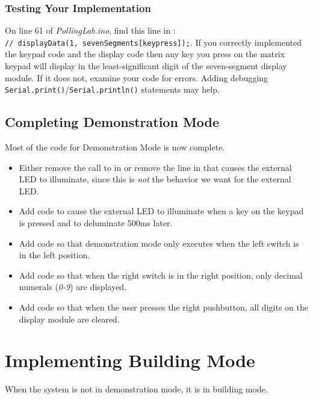 \subsubsection{Testing Your Implementation}

On line 61 of \textit{PollingLab.ino}, find this line in : \\
\lstinline{// displayData(1, sevenSegments[keypress]);}. If you correctly
implemented the keypad code and the display code then any key you press on the
matrix keypad will display in the least-significant digit of the seven-segment
display module. If it does not, examine your code for errors. Adding debugging
\lstinline{Serial.print()}/\lstinline{Serial.println()} statements may help.

\subsection{Completing Demonstration Mode}

Most of the code for Demonstration Mode is now complete.

    \begin{itemize}
    \item Either remove the call to  in
         or remove the line in  that
        causes the external LED to illuminate, since this is \textit{not} the
        behavior we want for the external LED.
    \item Add code to cause the external LED to illuminate when a key on the
        keypad is pressed and to deluminate 500ms later.
    \item Add code so that demonstration mode only executes when the left
        switch is in the left position.
    \item Add code so that when the right switch is in the right position, only
        decimal numerals (\textit{0-9}) are displayed.
    \item Add code so that when the user presses the right pushbutton, all
        digits on the display module are cleared.
    \end{itemize}

\section{Implementing Building Mode} \label{sec:BuildingMode}

When the system is not in demonstration mode, it is in building mode.

